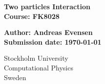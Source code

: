 \thispagestyle{empty}
\begin{titlepage}
   \begin{center}
       \huge
       \textbf{Two particles Interaction}\\
       \vspace*{1cm}
       \textbf{Course: FK8028}
       \large

       \vspace*{0.5cm}
       \textbf{Author: Andreas Evensen}\\
       \vspace*{.5cm}
       \small
       \vspace*{1.cm}
       \textbf{Submission date: \today}\\
       \vspace*{.5cm}
       \vspace{0.8cm}
     
       \small
       Stockholm University\\
       Computational Physics\\
       Sweden\\
   \end{center}
\end{titlepage}